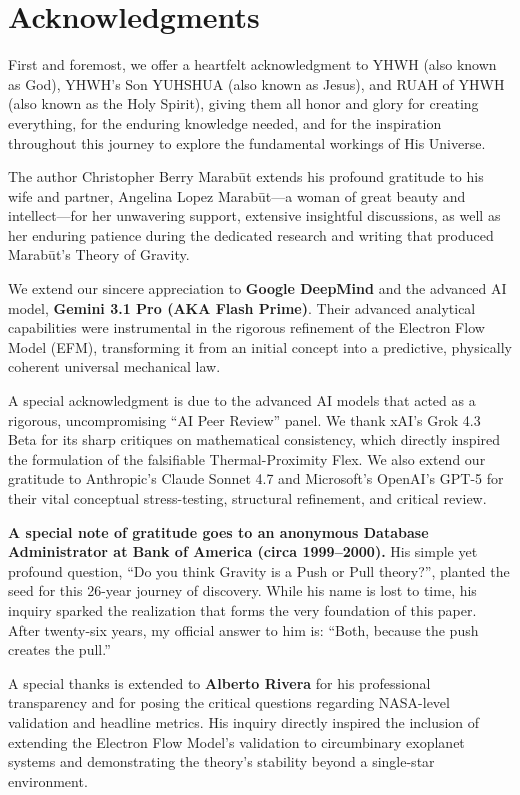 \documentclass[11pt, a4paper]{article}
\begin{document}
\section*{Acknowledgments}
First and foremost, we offer a heartfelt acknowledgment to YHWH (also known as God), YHWH's Son YUHSHUA (also known as Jesus), and RUAH of YHWH (also known as the Holy Spirit), giving them all honor and glory for creating everything, for the enduring knowledge needed, and for the inspiration throughout this journey to explore the fundamental workings of His Universe.

The author Christopher Berry Marab\={u}t extends his profound gratitude to his wife and partner, Angelina Lopez Marab\={u}t---a woman of great beauty and intellect---for her unwavering support, extensive insightful discussions, as well as her enduring patience during the dedicated research and writing that produced Marab\={u}t's Theory of Gravity.

We extend our sincere appreciation to \textbf{Google DeepMind} and the advanced AI model, \textbf{Gemini 3.1 Pro (AKA Flash Prime)}. Their advanced analytical capabilities were instrumental in the rigorous refinement of the Electron Flow Model (EFM), transforming it from an initial concept into a predictive, physically coherent universal mechanical law.

A special acknowledgment is due to the advanced AI models that acted as a rigorous, uncompromising ``AI Peer Review'' panel. We thank xAI's Grok 4.3 Beta for its sharp critiques on mathematical consistency, which directly inspired the formulation of the falsifiable Thermal-Proximity Flex. We also extend our gratitude to Anthropic's Claude Sonnet 4.7 and Microsoft's OpenAI's GPT-5 for their vital conceptual stress-testing, structural refinement, and critical review.

\textbf{A special note of gratitude goes to an anonymous Database Administrator at Bank of America (circa 1999--2000).} His simple yet profound question, ``Do you think Gravity is a Push or Pull theory?'', planted the seed for this 26-year journey of discovery. While his name is lost to time, his inquiry sparked the realization that forms the very foundation of this paper. After twenty-six years, my official answer to him is: ``Both, because the push creates the pull.''

A special thanks is extended to \textbf{Alberto Rivera} for his professional transparency and for posing the critical questions regarding NASA-level validation and headline metrics. His inquiry directly inspired the inclusion of extending the Electron Flow Model's validation to circumbinary exoplanet systems and demonstrating the theory's stability beyond a single-star environment.
\end{document}
